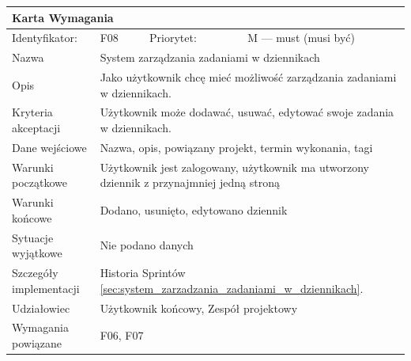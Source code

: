 \documentclass[a4paper,11pt]{report}
\begin{document}
		\begin{tabular}{|p{3cm}|p{2cm}|p{2cm}|p{6cm}|}
		\hline
		\multicolumn{4}{|p{12 cm}|}{Karta Wymagania}\\
		\hline
		Identyfikator: & F08 & Priorytet: & M — must (musi być)\\
		\hline
		Nazwa & \multicolumn{3}{|p{10 cm}|}{System zarządzania zadaniami w dziennikach}\\
		\hline
		Opis & \multicolumn{3}{|p{10 cm}|}{Jako użytkownik chcę mieć możliwość zarządzania zadaniami w dziennikach.}\\
		\hline
		Kryteria akceptacji & \multicolumn{3}{|p{10 cm}|}{Użytkownik może dodawać, usuwać, edytować swoje zadania w dziennikach.}\\
		\hline
		Dane wejściowe & \multicolumn{3}{|p{10 cm}|}{Nazwa, opis, powiązany projekt, termin wykonania, tagi}\\
		\hline
		Warunki początkowe & \multicolumn{3}{|p{10 cm}|}{Użytkownik jest zalogowany, użytkownik ma utworzony dziennik z przynajmniej jedną stroną}\\
		\hline
		Warunki końcowe & \multicolumn{3}{|p{10 cm}|}{Dodano, usunięto, edytowano dziennik}\\
		\hline
		Sytuacje wyjątkowe & \multicolumn{3}{|p{10 cm}|}{Nie podano danych}\\
		\hline
		Szczegóły implementacji & \multicolumn{3}{|p{10 cm}|}{Historia Sprintów \ref{sec:system_zarzadzania_zadaniami_w_dziennikach}.}\\
		\hline
		Udziałowiec & \multicolumn{3}{|p{10 cm}|}{Użytkownik końcowy, Zespół projektowy}\\
		\hline
		Wymagania powiązane & \multicolumn{3}{|p{10 cm}|}{F06, F07}\\
		\hline
		\end{tabular}
		\newline
		\vspace*{0,2 cm}
		\newline
\end{document}
